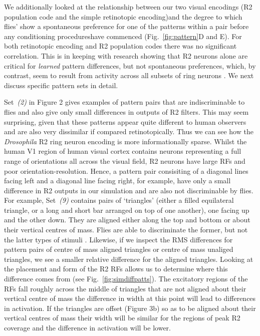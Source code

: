 We additionally looked at the relationship between our two visual encodings (R2 population code and the simple retinotopic encoding)and the degree to which flies' show a spontaneous preference for one of the patterns within a pair before any conditioning procedureshave commenced (Fig.~\ref{fig:pattern}D and E). For both retinotopic encoding and R2 population codes there was no significant correlation. This is in keeping with research showing that R2 neurons alone are critical for \emph{learned} pattern differences, but not spontaneous preferences, which, by contrast, seem to result from activity across all subsets of ring neurons \texthl{[cit]}.
We next discuss specific pattern sets in detail.

Set~\emph{(2)} in Figure 2 gives examples of pattern pairs that are indiscriminable to flies and also give only small differences in outputs of R2 filters. This may seem surprising, given that these patterns appear quite different to human observers and are also very dissimilar if compared retinotopically. Thus we can see how the \emph{Drosophila} R2 ring neuron encoding is more informationally sparse. Whilst the human V1 region of human visual cortex contains neurons representing a full range of orientations all across the visual field, R2 neurons have large RFs and poor orientation-resolution.
Hence, a pattern pair consisiting of a diagonal lines facing left and a diagonal line facing right, for example, have only a small difference in R2 outputs in our simulation and are also not discriminable by flies. For example, Set~\emph{(9)} contains pairs of `triangles' (either a filled equilateral triangle, or a long and short bar arranged on top of one another), one facing up and the other down.
They are aligned either along the top and bottom or about their vertical centres of mass.
Flies are able to discriminate the former, but not the latter types of stimuli \cite{Ernst1999}. Likewise, if we inspect the RMS differences for pattern pairs of centre of mass aligned triangles or centre of mass unaliged triangles, we see a smaller relative difference for the aligned triangles. Looking at the placement and form of the R2 RFs allows us to determine where this difference comes from (see Fig.~\ref{fig:simdiffpatts}).
The excitatory regions of the RFs fall roughly across the middle of triangles that are not aligned about their vertical centre of mass the difference in width at this point will lead to differences in activation. If the triangles are offset (Figure 3b) so as to be aligned about their vertical centres of mass their width will be similar for the regions of peak R2 coverage and the difference in activation will be lower.

